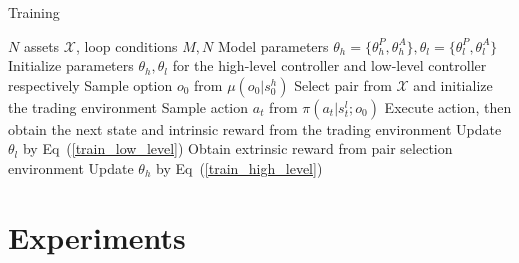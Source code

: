 \documentclass[sigconf]{acmart}
\begin{document}
\begin{algorithm}[H]
    \caption{Training}\label{training}
    \begin{algorithmic}[1]
        \REQUIRE $N$ assets $\mathcal{X}$, loop conditions $M, N$
        \ENSURE Model parameters $\theta_{h} = \{\theta_h^P, \theta_h^A\}, \theta_{l} = \{\theta_l^P, \theta_l^A\}$
        \STATE Initialize parameters $\theta_{h}, \theta_{l}$ for the high-level controller
        and low-level controller respectively
        \STATE Sample option $o_0$ from $\mu(o_0|s^h_0)$ 
        \STATE Select pair from $\mathcal{X}$ and initialize the trading environment
        \STATE Sample action $a_t$ from $\pi(a_t|s^l_t;o_0)$
        \STATE Execute action, then obtain the next state and intrinsic reward from the trading environment
        \STATE Update $\theta_l$ by Eq~(\ref{train_low_level})
        \ENDWHILE
        \ENDFOR
        \STATE Obtain extrinsic reward from pair selection environment
        \STATE Update $\theta_h$ by Eq~(\ref{train_high_level})
        \ENDFOR
    \end{algorithmic}
\end{algorithm}
	
\section{Experiments}
\end{document}
